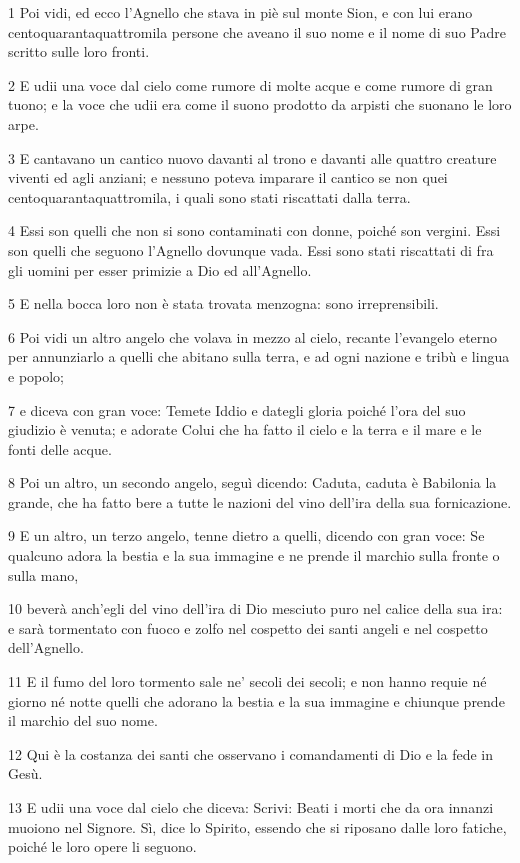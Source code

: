 \par 1 Poi vidi, ed ecco l'Agnello che stava in piè sul monte Sion, e con lui erano centoquarantaquattromila persone che aveano il suo nome e il nome di suo Padre scritto sulle loro fronti.
\par 2 E udii una voce dal cielo come rumore di molte acque e come rumore di gran tuono; e la voce che udii era come il suono prodotto da arpisti che suonano le loro arpe.
\par 3 E cantavano un cantico nuovo davanti al trono e davanti alle quattro creature viventi ed agli anziani; e nessuno poteva imparare il cantico se non quei centoquarantaquattromila, i quali sono stati riscattati dalla terra.
\par 4 Essi son quelli che non si sono contaminati con donne, poiché son vergini. Essi son quelli che seguono l'Agnello dovunque vada. Essi sono stati riscattati di fra gli uomini per esser primizie a Dio ed all'Agnello.
\par 5 E nella bocca loro non è stata trovata menzogna: sono irreprensibili.
\par 6 Poi vidi un altro angelo che volava in mezzo al cielo, recante l'evangelo eterno per annunziarlo a quelli che abitano sulla terra, e ad ogni nazione e tribù e lingua e popolo;
\par 7 e diceva con gran voce: Temete Iddio e dategli gloria poiché l'ora del suo giudizio è venuta; e adorate Colui che ha fatto il cielo e la terra e il mare e le fonti delle acque.
\par 8 Poi un altro, un secondo angelo, seguì dicendo: Caduta, caduta è Babilonia la grande, che ha fatto bere a tutte le nazioni del vino dell'ira della sua fornicazione.
\par 9 E un altro, un terzo angelo, tenne dietro a quelli, dicendo con gran voce: Se qualcuno adora la bestia e la sua immagine e ne prende il marchio sulla fronte o sulla mano,
\par 10 beverà anch'egli del vino dell'ira di Dio mesciuto puro nel calice della sua ira: e sarà tormentato con fuoco e zolfo nel cospetto dei santi angeli e nel cospetto dell'Agnello.
\par 11 E il fumo del loro tormento sale ne' secoli dei secoli; e non hanno requie né giorno né notte quelli che adorano la bestia e la sua immagine e chiunque prende il marchio del suo nome.
\par 12 Qui è la costanza dei santi che osservano i comandamenti di Dio e la fede in Gesù.
\par 13 E udii una voce dal cielo che diceva: Scrivi: Beati i morti che da ora innanzi muoiono nel Signore. Sì, dice lo Spirito, essendo che si riposano dalle loro fatiche, poiché le loro opere li seguono.
